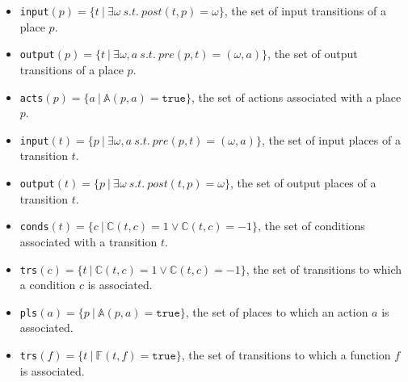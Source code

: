 \begin{itemize}
\item
  \texttt{input}$(p)=\{t~\vert~\exists\omega~s.t.~post(t,p)=\omega\}$,
  the set of input transitions of a place $p$.
\item
  \texttt{output}$(p)=\{t~\vert~\exists{}\omega,a~s.t.~pre(p,t)=(\omega,a)\}$,
  the set of output transitions of a place $p$.

\item \texttt{acts}$(p)=\{a~\vert~\mathbb{A}(p,a)=\mathtt{true}\}$,
  the set of actions associated with a place $p$.
\item
  \texttt{input}$(t)=\{p~\vert~\exists\omega,a~s.t.~pre(p,t)=(\omega,a)\}$,
  the set of input places of a transition $t$.
\item
  \texttt{output}$(t)=\{p~\vert~\exists\omega~s.t.~post(t,p)=\omega\}$,
  the set of output places of a transition $t$.
\item
  \texttt{conds}$(t)=\{c~\vert~\mathbb{C}(t,c)=1\lor\mathbb{C}(t,c)=-1\}$,
  the set of conditions associated with a transition $t$.
\item
  \texttt{trs}$(c)=\{t~\vert~\mathbb{C}(t,c)=1\lor\mathbb{C}(t,c)=-1\}$,
  the set of transitions to which a condition $c$ is associated.
\item \texttt{pls}$(a)=\{p~\vert~\mathbb{A}(p,a)=\mathtt{true}\}$, the
  set of places to which an action $a$ is associated.
\item \texttt{trs}$(f)=\{t~\vert~\mathbb{F}(t,f)=\mathtt{true}\}$, the
  set of transitions to which a function $f$ is associated.
\end{itemize}

